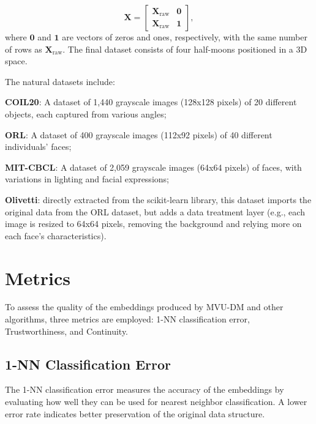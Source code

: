     \begin{equation}
        \boldsymbol{X} = \begin{bmatrix}
            \boldsymbol{X}_\text{raw} & \boldsymbol{0} \\
            \boldsymbol{X}_\text{raw} & \boldsymbol{1}
        \end{bmatrix},
    \end{equation}
    where $\boldsymbol{0}$ and $\boldsymbol{1}$ are vectors of zeros and ones, respectively, with the same number of rows as $\boldsymbol{X}_\text{raw}$. The final dataset consists of four half-moons positioned in a 3D space.


    The natural datasets include:
    \begin{inparaenum}
        \item \textbf{\ac{COIL20}}: A dataset of 1,440 grayscale images (128x128 pixels) of 20 different objects, each captured from various angles;
        \item \textbf{\ac{ORL}}: A dataset of 400 grayscale images (112x92 pixels) of 40 different individuals' faces;
        \item \textbf{\ac{MIT-CBCL}}: A dataset of 2,059 grayscale images (64x64 pixels) of faces, with variations in lighting and facial expressions;
        \item \textbf{Olivetti}: directly extracted from the scikit-learn library, this dataset imports the original data from the ORL dataset, but adds a data treatment layer (e.g., each image is resized to 64x64 pixels, removing the background and relying more on each face's characteristics).
    \end{inparaenum}


\section{Metrics}
    To assess the quality of the embeddings produced by MVU-DM and other algorithms, three metrics are employed: 1-NN classification error, Trustworthiness, and Continuity.

    \subsection{1-NN Classification Error}
        The 1-NN classification error measures the accuracy of the embeddings by evaluating how well they can be used for nearest neighbor classification. A lower error rate indicates better preservation of the original data structure.

